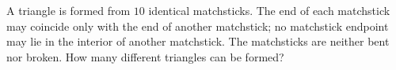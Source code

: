 A triangle is formed from $10$ identical matchsticks. The end of each matchstick may coincide only with the end of another matchstick; no matchstick endpoint may lie in the interior of another matchstick. The matchsticks are neither bent nor broken. How many different triangles can be formed?
